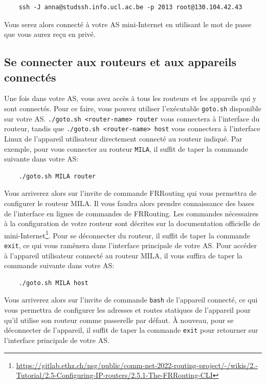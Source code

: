 \documentclass[a4paper, 11pt]{article}
\begin{document}
\begin{verbatim}
    ssh -J anna@studssh.info.ucl.ac.be -p 2013 root@130.104.42.43
\end{verbatim}

Vous serez alors connecté à votre AS mini-Internet en utilisant
le mot de passe que vous aurez reçu en privé.

\subsection{Se connecter aux routeurs et aux appareils connectés}

Une fois dans votre AS, vous avez accès à tous les routeurs et les
appareils qui y sont connectés. Pour ce faire, vous pouvez utiliser
l'exécutable \texttt{goto.sh} disponible sur votre AS.
\texttt{./goto.sh <router-name> router} vous connectera à l'interface
du routeur, tandis que \texttt{./goto.sh <router-name> host} vous
connectera à l'interface Linux de l'appareil utilisateur directement
connecté au routeur indiqué.
Par exemple, pour vous connecter au routeur \texttt{MILA}, il suffit
de taper la commande suivante dans votre AS:

\begin{verbatim}
    ./goto.sh MILA router
\end{verbatim}


Vous arriverez alors sur l'invite de commande FRRouting qui vous
permettra de configurer le routeur MILA.
Il vous faudra alors prendre connaissance des bases de l'interface
en lignes de commandes de FRRouting. Les commandes nécessaires
à la configuration de votre routeur sont décrites sur la documentation
officielle de 
mini-Internet\footnote{\url{https://gitlab.ethz.ch/nsg/public/comm-net-2022-routing-project/-/wikis/2.-Tutorial/2.5-Configuring-IP-routers/2.5.1-The-FRRouting-CLI}}.
Pour se déconnecter du
routeur, il suffit de taper la commande \texttt{exit}, ce qui vous
ramènera dans l'interface principale de votre AS.
Pour accéder à l'appareil utilisateur connecté au routeur MILA, il vous
suffira de taper la commande suivante dans votre AS:

\begin{verbatim}
    ./goto.sh MILA host
\end{verbatim}

Vous arriverez alors sur l'invite de commande \texttt{bash} de l'appareil
connecté, ce qui vous permettra de configurer les adresses et routes
statiques de l'appareil pour qu'il utilise son routeur comme
passerelle par défaut. À nouveau, pour se déconnecter de l'appareil,
il suffit de taper la commande \texttt{exit} pour retourner sur
l'interface principale de votre AS.
\end{document}
